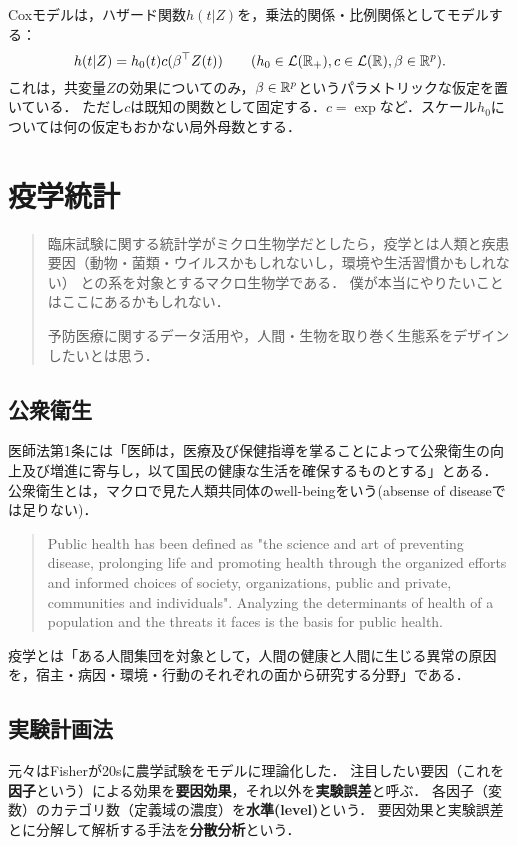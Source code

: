\documentclass[uplatex,dvipdfmx]{jsreport}
\begin{document}
\begin{model}
    Coxモデルは，ハザード関数$h(t|Z)$を，乗法的関係・比例関係としてモデルする：
    \[h(t|Z)=h_0(t)c(\beta^\top Z(t))\qquad(h_0\in\mathcal{L}(\mathbb{R}_+),c\in\mathcal{L}(\mathbb{R}),\beta\in\mathbb{R}^p).\]
    これは，共変量$Z$の効果についてのみ，$\beta\in\mathbb{R}^p$というパラメトリックな仮定を置いている．
    ただし$c$は既知の関数として固定する．$c=\exp$など．スケール$h_0$については何の仮定もおかない局外母数とする．
\end{model}

\chapter{疫学統計}

\begin{quotation}
    臨床試験に関する統計学がミクロ生物学だとしたら，疫学とは人類と疾患要因（動物・菌類・ウイルスかもしれないし，環境や生活習慣かもしれない）
    との系を対象とするマクロ生物学である．
    僕が本当にやりたいことはここにあるかもしれない．

    予防医療に関するデータ活用や，人間・生物を取り巻く生態系をデザインしたいとは思う．
\end{quotation}

\section{公衆衛生}

医師法第1条には「医師は，医療及び保健指導を掌ることによって公衆衛生の向上及び増進に寄与し，以て国民の健康な生活を確保するものとする」とある．
公衆衛生とは，マクロで見た人類共同体のwell-beingをいう(absense of diseaseでは足りない)．
\begin{quote}
    Public health has been defined as "the science and art of preventing disease, prolonging life and promoting health through the organized efforts and informed choices of society, organizations, public and private, communities and individuals".
    Analyzing the determinants of health of a population and the threats it faces is the basis for public health.
\end{quote}
疫学とは「ある人間集団を対象として，人間の健康と人間に生じる異常の原因を，宿主・病因・環境・行動のそれぞれの面から研究する分野」である．

\section{実験計画法}

\begin{history}
    元々はFisherが20sに農学試験をモデルに理論化した．
    注目したい要因（これを\textbf{因子}という）による効果を\textbf{要因効果}，それ以外を\textbf{実験誤差}と呼ぶ．
    各因子（変数）のカテゴリ数（定義域の濃度）を\textbf{水準(level)}という．
    要因効果と実験誤差とに分解して解析する手法を\textbf{分散分析}という．
\end{history}
\end{document}
